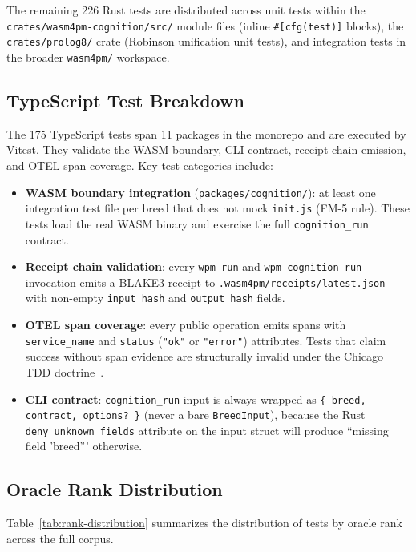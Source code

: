 \noindent The remaining 226 Rust tests are distributed across unit tests within the
\texttt{crates/wasm4pm-cognition/src/} module files (inline \texttt{\#[cfg(test)]} blocks),
the \texttt{crates/prolog8/} crate (Robinson unification unit tests), and integration tests
in the broader \texttt{wasm4pm/} workspace.

\subsection{TypeScript Test Breakdown}

The 175 TypeScript tests span 11 packages in the monorepo and are executed by Vitest. They
validate the WASM boundary, CLI contract, receipt chain emission, and OTEL span coverage.
Key test categories include:

\begin{itemize}
  \item \textbf{WASM boundary integration} (\texttt{packages/cognition/}): at least one
    integration test file per breed that does not mock \texttt{init.js} (FM-5 rule). These
    tests load the real WASM binary and exercise the full \texttt{cognition\_run} contract.
  \item \textbf{Receipt chain validation}: every \texttt{wpm run} and \texttt{wpm cognition
    run} invocation emits a BLAKE3 receipt to \texttt{.wasm4pm/receipts/latest.json} with
    non-empty \texttt{input\_hash} and \texttt{output\_hash} fields.
  \item \textbf{OTEL span coverage}: every public operation emits spans with
    \texttt{service\_name} and \texttt{status} (\texttt{"ok"} or \texttt{"error"}) attributes.
    Tests that claim success without span evidence are structurally invalid under the
    Chicago TDD doctrine~\citep{vanderaalst2016}.
  \item \textbf{CLI contract}: \texttt{cognition\_run} input is always wrapped as
    \texttt{\{ breed, contract, options? \}} (never a bare \texttt{BreedInput}), because the
    Rust \texttt{deny\_unknown\_fields} attribute on the input struct will produce
    ``missing field 'breed''' otherwise.
\end{itemize}

\subsection{Oracle Rank Distribution}

Table~\ref{tab:rank-distribution} summarizes the distribution of tests by oracle rank across
the full corpus.

